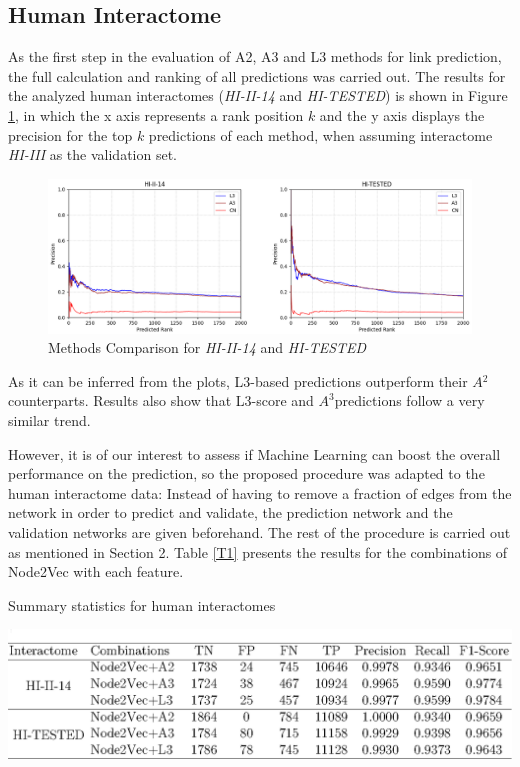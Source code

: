 \subsection*{Human Interactome}

As the first step in the evaluation of A2, A3 and L3 methods for link
prediction, the full calculation and ranking of all predictions was
carried out. The results for the analyzed human interactomes (\emph{HI-II-14}
and \emph{HI-TESTED}) is shown in Figure \ref{fig:HI1}, in which
the x axis represents a rank position $k$ and the y axis displays
the precision for the top $k$ predictions of each method, when assuming
interactome \emph{HI-III} as the validation set. 

\begin{figure}[h]
\caption{\label{fig:HI1}Methods Comparison for \emph{HI-II-14} and \emph{HI-TESTED}}
	\includegraphics[width=\textwidth ]{figures/figure2.eps}
\end{figure}

As it can be inferred from the plots, L3-based predictions outperform
their $A{{}^2}$ counterparts. Results also show that L3-score and
$A^{3}$predictions follow a very similar trend.

However, it is of our interest to assess if Machine Learning can boost
the overall performance on the prediction, so the proposed procedure
was adapted to the human interactome data: Instead of having to remove
a fraction of edges from the network in order to predict and validate,
the prediction network and the validation networks are given beforehand.
The rest of the procedure is carried out as mentioned in Section 2.
Table \ref{T1} presents the results for the combinations of Node2Vec
with each feature.

\begin{table}
\caption{\label{T1}Summary statistics for human interactomes}
\includegraphics[width=1\columnwidth]{figures/T1}
\end{table}

